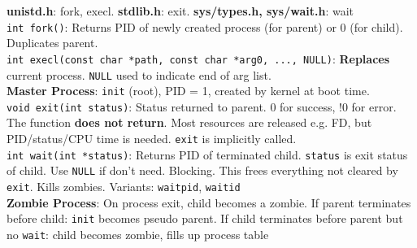 \documentclass{article}
\begin{document}
\begin{multicols*}{3}
\textbf{unistd.h}: fork, execl. \textbf{stdlib.h}: exit. \textbf{sys/types.h, sys/wait.h}: wait\\
\texttt{int fork()}: Returns PID of newly created process (for parent) or 0 (for child). Duplicates parent.\\
\texttt{int execl(const char *path, const char *arg0, ..., NULL)}: \textbf{Replaces} current process. \texttt{NULL} used to indicate end of arg list. \\
\textbf{Master Process}: \texttt{init} (root), PID = 1, created by kernel at boot time.\\
\texttt{void exit(int status)}: Status returned to parent. 0 for success, !0 for error. The function \textbf{does not return}. Most resources are released e.g. FD, but PID/status/CPU time is needed. \texttt{exit} is implicitly called. \\
\texttt{int wait(int *status)}: Returns PID of terminated child. \texttt{status} is exit status of child. Use \texttt{NULL} if don't need. Blocking. This frees everything not cleared by \texttt{exit}. Kills zombies. Variants: \texttt{waitpid}, \texttt{waitid}\\
\textbf{Zombie Process}: On process exit, child becomes a zombie. If parent terminates before child: \texttt{init} becomes pseudo parent. If child terminates before parent but no \texttt{wait}: child becomes zombie, fills up process table

\end{multicols*}
\end{document}
